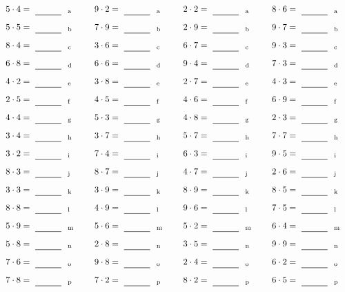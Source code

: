 \documentclass
[
  draft    = true,
  fontsize = 11pt,
  parskip  = half-
]
{scrartcl}
\begin{document}
\par\vfill\par
\begin{align*}
    \pline{5\cdot4}&=\rline{a}
  & \pline{9\cdot2}&=\rline{a}
  & \pline{2\cdot2}&=\rline{a}
  & \pline{8\cdot6}&=\rline{a} \\[1ex]
    \pline{5\cdot5}&=\rline{b}
  & \pline{7\cdot9}&=\rline{b}
  & \pline{2\cdot9}&=\rline{b}
  & \pline{9\cdot7}&=\rline{b} \\[1ex]
    \pline{8\cdot4}&=\rline{c}
  & \pline{3\cdot6}&=\rline{c}
  & \pline{6\cdot7}&=\rline{c}
  & \pline{9\cdot3}&=\rline{c} \\[1ex]
    \pline{6\cdot8}&=\rline{d}
  & \pline{6\cdot6}&=\rline{d}
  & \pline{9\cdot4}&=\rline{d}
  & \pline{7\cdot3}&=\rline{d} \\[1ex]
    \pline{4\cdot2}&=\rline{e}
  & \pline{3\cdot8}&=\rline{e}
  & \pline{2\cdot7}&=\rline{e}
  & \pline{4\cdot3}&=\rline{e} \\[1ex]
    \pline{2\cdot5}&=\rline{f}
  & \pline{4\cdot5}&=\rline{f}
  & \pline{4\cdot6}&=\rline{f}
  & \pline{6\cdot9}&=\rline{f} \\[1ex]
    \pline{4\cdot4}&=\rline{g}
  & \pline{5\cdot3}&=\rline{g}
  & \pline{4\cdot8}&=\rline{g}
  & \pline{2\cdot3}&=\rline{g} \\[1ex]
    \pline{3\cdot4}&=\rline{h}
  & \pline{3\cdot7}&=\rline{h}
  & \pline{5\cdot7}&=\rline{h}
  & \pline{7\cdot7}&=\rline{h} \\[1ex]
    \pline{3\cdot2}&=\rline{i}
  & \pline{7\cdot4}&=\rline{i}
  & \pline{6\cdot3}&=\rline{i}
  & \pline{9\cdot5}&=\rline{i} \\[1ex]
    \pline{8\cdot3}&=\rline{j}
  & \pline{8\cdot7}&=\rline{j}
  & \pline{4\cdot7}&=\rline{j}
  & \pline{2\cdot6}&=\rline{j} \\[1ex]
    \pline{3\cdot3}&=\rline{k}
  & \pline{3\cdot9}&=\rline{k}
  & \pline{8\cdot9}&=\rline{k}
  & \pline{8\cdot5}&=\rline{k} \\[1ex]
    \pline{8\cdot8}&=\rline{l}
  & \pline{4\cdot9}&=\rline{l}
  & \pline{9\cdot6}&=\rline{l}
  & \pline{7\cdot5}&=\rline{l} \\[1ex]
    \pline{5\cdot9}&=\rline{m}
  & \pline{5\cdot6}&=\rline{m}
  & \pline{5\cdot2}&=\rline{m}
  & \pline{6\cdot4}&=\rline{m} \\[1ex]
    \pline{5\cdot8}&=\rline{n}
  & \pline{2\cdot8}&=\rline{n}
  & \pline{3\cdot5}&=\rline{n}
  & \pline{9\cdot9}&=\rline{n} \\[1ex]
    \pline{7\cdot6}&=\rline{o}
  & \pline{9\cdot8}&=\rline{o}
  & \pline{2\cdot4}&=\rline{o}
  & \pline{6\cdot2}&=\rline{o} \\[1ex]
    \pline{7\cdot8}&=\rline{p}
  & \pline{7\cdot2}&=\rline{p}
  & \pline{8\cdot2}&=\rline{p}
  & \pline{6\cdot5}&=\rline{p}
\end{align*}
\end{document}
